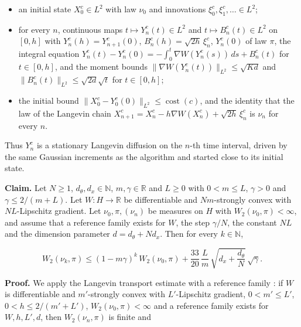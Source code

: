 \documentclass[11pt,a4paper]{article}
\begin{document}
\begin{itemize}


\item an initial state \(X_0^c\in L^2\) with law \(\nu_0\) and innovations \(\xi_0^c,\xi_1^c,\dots\in L^2\);

\item for every \(n\), continuous maps \(t\mapsto Y_n^c(t)\in L^2\) and \(t\mapsto B_n^c(t)\in L^2\) on \([0,h]\) with \(Y_n^c(h)=Y_{n+1}^c(0)\), \(B_n^c(h)=\sqrt{2h}\,\xi_n^c\), \(Y_n^c(0)\) of law \(\pi\), the integral equation \(Y_n^c(t)-Y_n^c(0)=-\int_0^t\nabla W(Y_n^c(s))\,ds+B_n^c(t)\) for \(t\in[0,h]\), and the moment bounds \(\|\nabla W(Y_n^c(t))\|_{L^2}\le\sqrt{Kd}\) and \(\|B_n^c(t)\|_{L^2}\le\sqrt{2d}\sqrt t\) for \(t\in[0,h]\);

\item the initial bound \(\|X_0^c-Y_0^c(0)\|_{L^2}\le\operatorname{cost}(c)\), and the identity that the law of the Langevin chain \(X_{n+1}^c=X_n^c-h\nabla W(X_n^c)+\sqrt{2h}\,\xi_n^c\) is \(\nu_n\) for every \(n\).

\end{itemize}



Thus \(Y_n^c\) is a stationary Langevin diffusion on the \(n\)-th time interval, driven by the same Gaussian increments as the algorithm and started close to its initial state.




\textbf{Claim.} Let \(N\ge1\), \(d_\theta,d_x\in\mathbb N\), \(m,\gamma\in\mathbb R\) and \(L\ge0\) with \(0<m\le L\), \(\gamma>0\) and \(\gamma\le2/(m+L)\). Let \(W:H\to\mathbb R\) be differentiable and \(Nm\)-strongly convex with \(NL\)-Lipschitz gradient. Let \(\nu_0,\pi,(\nu_n)\) be measures on \(H\) with \(W_2(\nu_0,\pi)<\infty\), and assume that a reference family exists for \(W\), the step \(\gamma/N\), the constant \(NL\) and the dimension parameter \(d=d_\theta+Nd_x\). Then for every \(k\in\mathbb N\),


\[W_2(\nu_k,\pi)\le(1-m\gamma)^k\,W_2(\nu_0,\pi)+\frac{33}{20}\,\frac Lm\,\sqrt{d_x+\frac{d_\theta}N}\,\sqrt\gamma .\]


\textbf{Proof.} We apply the Langevin transport estimate with a reference family \cite[Section~3.47.4]{LangevinLean2026ULASC}: if \(W\) is differentiable and \(m'\)-strongly convex with \(L'\)-Lipschitz gradient, \(0<m'\le L'\), \(0<h\le2/(m'+L')\), \(W_2(\nu_0,\pi)<\infty\) and a reference family exists for \(W,h,L',d\), then \(W_2(\nu_n,\pi)\) is finite and
\end{document}
